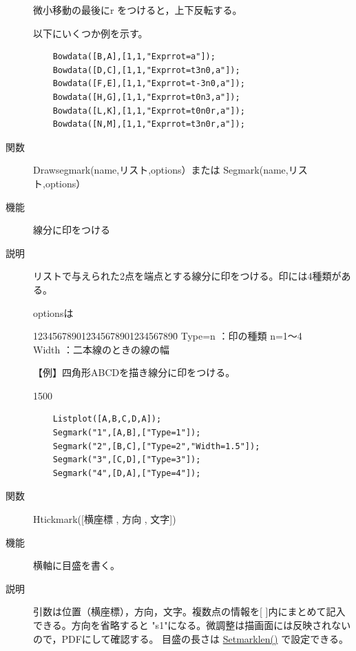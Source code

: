 \documentclass[papersize,a4paper,12pt,uplatex]{jsarticle}
\begin{document}
\begin{description}
 微小移動の最後にr をつけると，上下反転する。
 
以下にいくつか例を示す。
\begin{verbatim}
    Bowdata([B,A],[1,1,"Exprrot=a"]);
    Bowdata([D,C],[1,1,"Exprrot=t3n0,a"]);
    Bowdata([F,E],[1,1,"Exprrot=t-3n0,a"]);
    Bowdata([H,G],[1,1,"Exprrot=t0n3,a"]);
    Bowdata([L,K],[1,1,"Exprrot=t0n0r,a"]);
    Bowdata([N,M],[1,1,"Exprrot=t3n0r,a"]);
\end{verbatim}
\hspace{10mm} 


\hypertarget{drawsegmark}{}
\item[関数]  Drawsegmark(name,リスト,options）または Segmark(name,リスト,options）
\item[機能]  線分に印をつける
\item[説明]  リストで与えられた2点を端点とする線分に印をつける。印には4種類がある。

optionsは
\begin{tabbing}
1234\=56789012\=345678901234567890\=\kill
 \> Type=n \>：印の種類 n=1〜4\\
 \> Width  \>：二本線のときの線の幅
\end{tabbing}

  【例】四角形ABCDを描き線分に印をつける。
  
\begin{layer}{150}{0}
\end{layer}
\hspace{50mm}
\begin{verbatim}
    Listplot([A,B,C,D,A]);
    Segmark("1",[A,B],["Type=1"]); 
    Segmark("2",[B,C],["Type=2","Width=1.5"]);
    Segmark("3",[C,D],["Type=3"]);
    Segmark("4",[D,A],["Type=4"]);
\end{verbatim}

\vspace{\baselineskip}
\hypertarget{htickmark}{}
\item[関数]  Htickmark([横座標 , 方向 , 文字])
\item[機能]  横軸に目盛を書く。
\item[説明]  引数は位置（横座標），方向，文字。複数点の情報を[ ]内にまとめて記入できる。方向を省略すると "s1"になる。微調整は描画面には反映されないので，PDFにして確認する。
目盛の長さは \hyperlink{setmarklen}{Setmarklen()} で設定できる。


\end{description}
\end{document}
